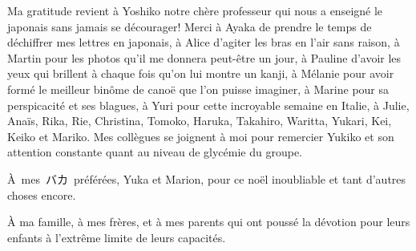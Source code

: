 Ma gratitude revient à Yoshiko notre chère professeur qui nous a
enseigné le japonais sans jamais se décourager! Merci à Ayaka de
prendre le temps de déchiffrer mes lettres en japonais, à Alice
d'agiter les bras en l'air sans raison, à Martin pour les photos qu'il
me donnera peut-être un jour, à Pauline d'avoir les yeux qui brillent
à chaque fois qu'on lui montre un kanji, à Mélanie pour avoir formé le
meilleur binôme de canoë que l'on puisse imaginer, à Marine pour sa
perspicacité et ses blagues, à Yuri pour cette incroyable semaine en
Italie, à Julie, Anaïs, Rika, Rie, Christina, Tomoko, Haruka,
Takahiro, Waritta, Yukari, Kei, Keiko et Mariko. Mes collègues se
joignent à moi pour remercier Yukiko et son attention constante quant
au niveau de glycémie du groupe.


\begin{CJK*}{UTF8}{min}%
À~mes~バカ~préférées, Yuka et Marion, pour ce noël inoubliable et tant
d'autres choses encore.
\end{CJK*}



À ma famille, à mes frères, et à mes parents qui ont poussé la
dévotion pour leurs enfants à l'extrême limite de leurs capacités.
